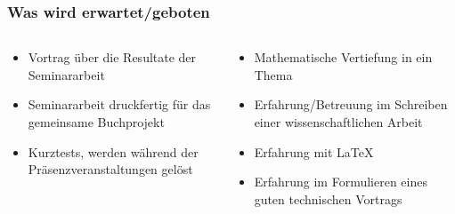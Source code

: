 %
%
%
\bgroup
\begin{frame}[t]
\setlength{\abovedisplayskip}{5pt}
\setlength{\belowdisplayskip}{5pt}
\frametitle{Was wird erwartet/geboten}
\vspace{-20pt}
\begin{columns}[t,onlytextwidth]
\begin{column}{0.48\textwidth}
\begin{itemize}
\item Vortrag über die Resultate der Seminararbeit
\item Seminararbeit druckfertig für das gemeinsame Buchprojekt
\item Kurztests, werden während der Präsenzveranstaltungen gelöst
\end{itemize}
\end{column}
\begin{column}{0.48\textwidth}
\begin{itemize}
\item Mathematische Vertiefung in ein Thema
\item Erfahrung/Betreuung im Schreiben einer wissenschaftlichen Arbeit
\item Erfahrung mit \LaTeX
\item Erfahrung im Formulieren eines guten technischen Vortrags
\end{itemize}
\end{column}
\end{columns}
\end{frame}
\egroup
